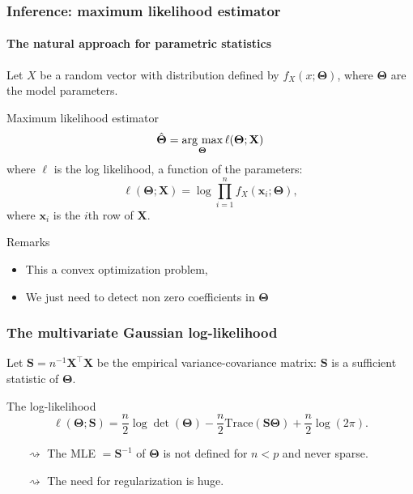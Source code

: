 \begin{frame}
  \frametitle{Inference: maximum likelihood estimator}
  \framesubtitle{The natural approach for parametric statistics}
  
  Let   $X$  be  a   random  vector   with  distribution   defined  by
  $f_{X}(x;\boldsymbol\Theta)$,  where   $\boldsymbol\Theta$  are  the
  model parameters.

  \vfill

  \begin{block}{Maximum likelihood estimator}
    \begin{equation*}
      \hat{\boldsymbol\Theta}      =      \mathop{\mathrm{arg\ max}}_{\boldsymbol\Theta}
      \ell(\boldsymbol\Theta; \mathbf{X})
    \end{equation*} 
    where  $\ell$ is  the log  likelihood, a  function  of the
    parameters:
    \begin{equation*}
      \ell(\boldsymbol\Theta;      \mathbf{X})      =     \log
      \prod_{i=1}^n f_{X}(\mathbf{x}_i;\boldsymbol\Theta),
    \end{equation*}
    where $\mathbf{x}_i$ is the $i$th row of $\mathbf{X}$.
  \end{block}
  
  \vfill
  
  \begin{block}{Remarks}
    \begin{itemize}
    \item This a convex optimization problem,
    \item We just need to detect non zero coefficients in $\boldsymbol\Theta$
    \end{itemize}
  \end{block}
  
\end{frame}

\begin{frame}
  \frametitle{The multivariate Gaussian log-likelihood }
  
  Let  $\mathbf{S}  =  n^{-1}\mathbf{X}^\intercal \mathbf{X}$  be  the
  empirical variance-covariance  matrix: $\mathbf{S}$ is  a sufficient
  statistic of $ \boldsymbol\Theta$.

  \vfill

  \begin{block}{The log-likelihood}
    \begin{equation*}
      \ell(\boldsymbol\Theta; \mathbf{S}) =
      \frac{n}{2}     \log    \det     (\boldsymbol\Theta)  - \frac{n}{2}
      \mathrm{Trace}(\mathbf{S} \boldsymbol\Theta) + \frac{n}{2}\log(2\pi).
    \end{equation*}
  \end{block}
  
  \vfill
  
  \begin{itemize}
  \item[$\rightsquigarrow$]    The     MLE    $=\mathbf{S}^{-1}$    of
    $\boldsymbol\Theta$ is not defined for $n< p$ and never sparse.
  \item[$\rightsquigarrow$] The need for regularization is huge.
  \end{itemize}
\end{frame}

